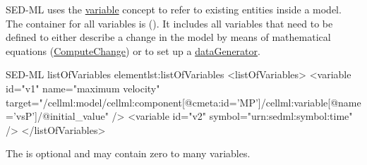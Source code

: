 \label{sec:listOfVariables}

SED-ML uses the \hyperref[class:variable]{variable} concept to refer to existing entities inside a model. The container for all variables is   (). It includes all variables that need to be defined to either describe a change in the model by means of mathematical equations (\hyperref[class:computeChange]{ComputeChange}) or to set up a \hyperref[class:dataGenerator]{dataGenerator}.

%

%
\begin{myXmlLst}{SED-ML listOfVariables element}{lst:listOfVariables}
<listOfVariables>
 <variable id="v1" name="maximum velocity" target="/cellml:model/cellml:component[@cmeta:id='MP']/cellml:variable[@name='vsP']/@initial_value" />
 <variable id="v2" symbol="urn:sedml:symbol:time" />
</listOfVariables>
\end{myXmlLst}
%
 The  is optional and may contain zero to many variables. 
